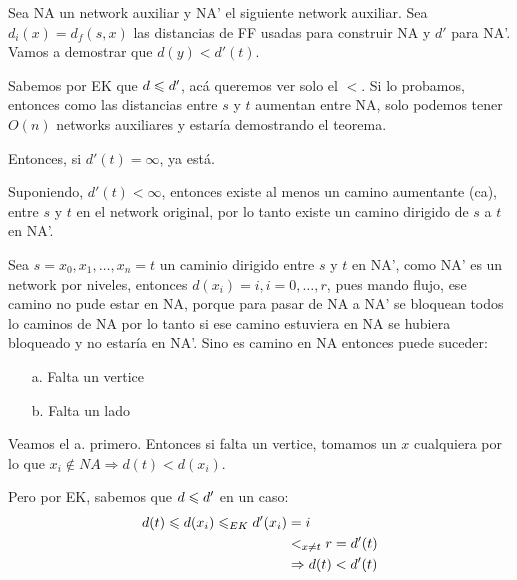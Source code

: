 \documentclass[12pt,a4paper]{article}
\begin{document}
Sea NA un network auxiliar y NA' el siguiente network auxiliar. Sea $d_{i}(x) = d_{f}(s,x)$ 
las distancias de FF usadas para construir NA y $d'$ para NA'. Vamos a demostrar que 
$d(y) < d'(t)$.
\medskip

Sabemos por EK que $d \leqslant d'$, acá queremos ver solo el $<$. Si lo probamos, entonces 
como las distancias entre $s$ y $t$ aumentan entre NA, solo podemos tener $O(n)$ 
networks auxiliares y estaría demostrando el teorema.
\medskip

Entonces, si $d'(t) = \infty$, ya está.
\medskip

Suponiendo, $d'(t) < \infty$, entonces existe al menos un camino aumentante (ca), 
entre $s$ y $t$ en el network original, por lo tanto existe un camino dirigido de 
$s$ a $t$ en NA'.
\medskip

Sea $s=x_{0},x_{1},\ldots,x_{n}=t$ un caminio dirigido entre $s$ y $t$ en NA', como 
NA' es un network por niveles, entonces $d(x_{i}) = i, i=0,\ldots,r$, pues mando flujo,
ese camino no pude estar en NA, porque para pasar de NA a NA' se bloquean todos lo 
caminos de NA por lo tanto si ese camino estuviera en NA se hubiera bloqueado y no 
estaría en NA'. Sino es camino en NA entonces puede suceder:
\begin{itemize}
    \item [a.] Falta un vertice 
    \item [b.] Falta un lado
\end{itemize}

Veamos el a. primero. Entonces si falta un vertice, tomamos un $x$ cualquiera por 
lo que $x_{i} \notin NA \Rightarrow d(t) < d(x_{i})$.
\medskip

Pero por EK, sabemos que $d \leqslant d'$ en un caso:
\begin{align*}
    d(t) \leqslant d(x_{i}) \leqslant_{EK} d'(x_{i}) &= i\\
    &<_{x\neq t} r = d'(t)\\
    &\Rightarrow d(t) < d'(t)
\end{align*}
\end{document}
